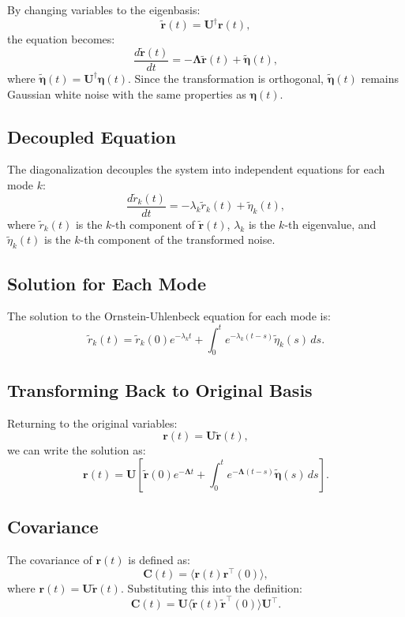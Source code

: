 \documentclass[English, Lau, oneside]{sapthesis}
\begin{document}
By changing variables to the eigenbasis:
\[
\tilde{\mathbf{r}}(t) = \mathbf{U}^\dagger \mathbf{r}(t),
\]
the equation becomes:
\[
\frac{d \tilde{\mathbf{r}}(t)}{dt} = -\boldsymbol{\Lambda} \tilde{\mathbf{r}}(t) + \tilde{\boldsymbol{\eta}}(t),
\]
where \(\tilde{\boldsymbol{\eta}}(t) = \mathbf{U}^\dagger \boldsymbol{\eta}(t)\). Since the transformation is orthogonal, \(\tilde{\boldsymbol{\eta}}(t)\) remains Gaussian white noise with the same properties as \(\boldsymbol{\eta}(t)\).

\subsection{Decoupled Equation}

The diagonalization decouples the system into independent equations for each mode \(k\):
\[
\frac{d \tilde{r}_k(t)}{dt} = -\lambda_k \tilde{r}_k(t) + \tilde{\eta}_k(t),
\]
where \(\tilde{r}_k(t)\) is the \(k\)-th component of \(\tilde{\mathbf{r}}(t)\), \(\lambda_k\) is the \(k\)-th eigenvalue, and \(\tilde{\eta}_k(t)\) is the \(k\)-th component of the transformed noise.

\subsection{Solution for Each Mode}

The solution to the Ornstein-Uhlenbeck equation for each mode is:
\[
\tilde{r}_k(t) = \tilde{r}_k(0) e^{-\lambda_k t} + \int_0^t e^{-\lambda_k (t-s)} \tilde{\eta}_k(s) \, ds.
\]

\subsection{Transforming Back to Original Basis}

Returning to the original variables:
\[
\mathbf{r}(t) = \mathbf{U} \tilde{\mathbf{r}}(t),
\]
we can write the solution as:
\[
\mathbf{r}(t) = \mathbf{U} \left[ \tilde{\mathbf{r}}(0) e^{-\boldsymbol{\Lambda} t} + \int_0^t e^{-\boldsymbol{\Lambda} (t-s)} \tilde{\boldsymbol{\eta}}(s) \, ds \right].
\]

\subsection {Covariance}
The covariance of \(\mathbf{r}(t)\) is defined as:
\[
\mathbf{C}(t) = \langle \mathbf{r}(t) \mathbf{r}^\top(0) \rangle,
\]
where \(\mathbf{r}(t) = \mathbf{U} \tilde{\mathbf{r}}(t)\). Substituting this into the definition:
\[
\mathbf{C}(t) = \mathbf{U} \langle \tilde{\mathbf{r}}(t) \tilde{\mathbf{r}}^\top(0) \rangle \mathbf{U}^\top.
\]
\end{document}
